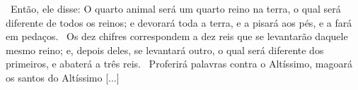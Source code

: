 \documentclass[12pt,aspectratio=169]{beamer}
\newcommand{\ver}[1]{%
    \raisebox{0.50ex}{%
        \scalebox{1.1}{%
            \pmb{\textbf{\textcolor{BSpbg}{#1}}}%
        }%
    }%
}
\newcommand{\WIDEQUOTE}[1]{%
    \par\noindent\hspace*{0.02\linewidth}%
    \begin{minipage}{0.92\linewidth}%
        \linespread{1.25}\large{#1}%
    \end{minipage}%
}
\newcommand{\RED}[1]{{\textcolor{TXred}{#1}}}
\newcommand{\ORA}[1]{{\textcolor{TXora}{#1}}}
\newcommand{\YEL}[1]{{\textcolor{TXyel}{#1}}}
\newcommand{\GRE}[1]{{\textcolor{TXgre}{#1}}}
\newcommand{\CYA}[1]{{\textcolor{TXcya}{#1}}}
\newcommand{\BLU}[1]{{\textcolor{TXblu}{#1}}}
\newcommand{\MAG}[1]{{\textcolor{TXmag}{#1}}}
\begin{document}
    \begin{frame}
        \WIDEQUOTE{%
            \ver{(ARA) Dn~7.23}~Então, ele disse: O quarto animal será um \ORA{quarto  reino
            na terra}, o qual será \YEL{diferente de todos os reinos}; e \GRE{devorará  toda
            a terra}, e a \RED{pisará}\uncover<3>{\YEL{\pmb{$\otimes$}}} \RED{aos pés}, e  a
            \BLU{fará em pedaços}. \ver{24}~Os \CYA{dez  chifres}  correspondem  a  \CYA{dez
            reis}        que        se        \CYA{levantarão}         daquele         mesmo
            reino;\uncover<2->{\YEL{\pmb{$\oplus$}}}  e,  \MAG{depois  deles,  se  levantará
            outro},  o  qual  será  diferente  dos  primeiros,  e  abaterá  a   três   reis.
            \ver{25}~Proferirá palavras contra o Altíssimo, magoará os santos  do  Altíssimo
            [...]
        }
    \end{frame}




\end{document}
